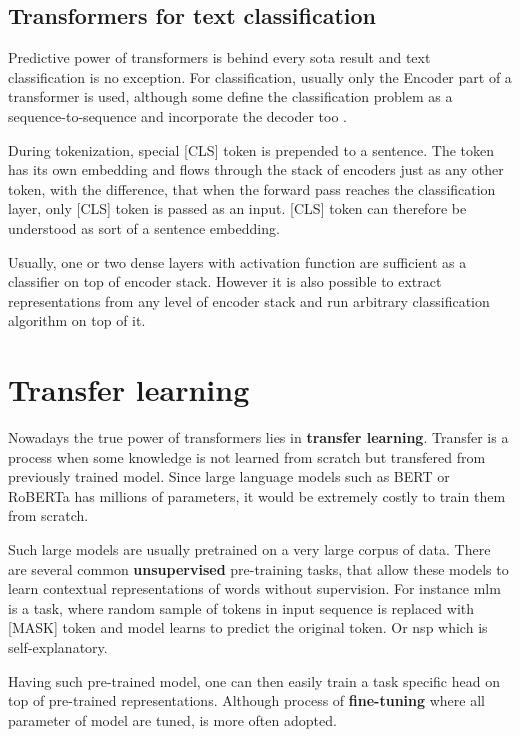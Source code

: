 \subsection{Transformers for text classification}
Predictive power of transformers is behind every \gls{sota} result and text classification is no exception. For classification, usually only the Encoder part of a transformer is used, although some define the classification problem as a sequence-to-sequence and incorporate the decoder too \cite{raffel2019exploring}.

During tokenization, special [CLS] token is prepended to a sentence. The token has its own embedding and flows through the stack of encoders just as any other token, with the difference, that when the forward pass reaches the classification layer, only [CLS] token is passed as an input. [CLS] token can therefore be understood as sort of a sentence embedding.

Usually, one or two dense layers with activation function are sufficient as a classifier on top of encoder stack. However it is also possible to extract representations from any level of encoder stack and run arbitrary classification algorithm on top of it.




\section{Transfer learning}
Nowadays the true power of transformers lies in \textbf{transfer learning}. Transfer is a process when some knowledge is not learned from scratch but transfered from previously trained model. Since large language models such as BERT or RoBERTa has millions of parameters, it would be extremely costly to train them from scratch. 

Such large models are usually pretrained on a very large corpus of data. There are several common \textbf{unsupervised} pre-training tasks, that allow these models to learn contextual representations of words without supervision. For instance \gls{mlm} is a task, where random sample of tokens in input sequence is replaced with [MASK] token and model learns to predict the original token. Or \gls{nsp} which is self-explanatory.

Having such pre-trained model, one can then easily train a task specific head on top of pre-trained representations. Although process of \textbf{fine-tuning} where all parameter of model are tuned, is more often adopted.
